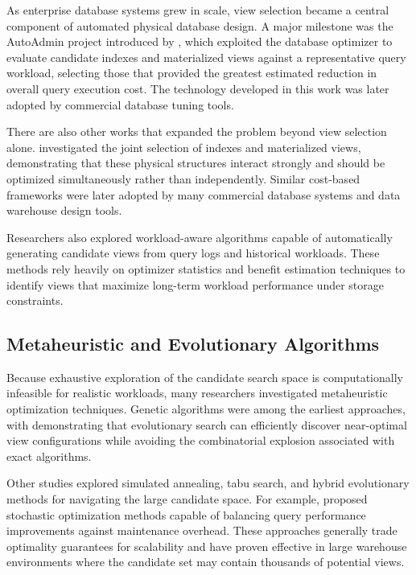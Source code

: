 As enterprise database systems grew in scale, view selection became a central component of automated physical database design. A major milestone was the AutoAdmin project introduced by \textcite{Agrawal_2001}, which exploited the database optimizer to evaluate candidate indexes and materialized views against a representative query workload, selecting those that provided the greatest estimated reduction in overall query execution cost. The technology developed in this work was later adopted by commercial database tuning tools.

There are also other works that expanded the problem beyond view selection alone. \textcite{Agrawal_2000} investigated the joint selection of indexes and materialized views, demonstrating that these physical structures interact strongly and should be optimized simultaneously rather than independently. Similar cost-based frameworks were later adopted by many commercial database systems and data warehouse design tools.

Researchers also explored workload-aware algorithms capable of automatically generating candidate views from query logs and historical workloads. These methods rely heavily on optimizer statistics and benefit estimation techniques to identify views that maximize long-term workload performance under storage constraints.

\subsection{Metaheuristic and Evolutionary Algorithms}

Because exhaustive exploration of the candidate search space is computationally infeasible for realistic workloads, many researchers investigated metaheuristic optimization techniques. Genetic algorithms were among the earliest approaches, with \textcite{Kratica_2003} demonstrating that evolutionary search can efficiently discover near-optimal view configurations while avoiding the combinatorial explosion associated with exact algorithms.

Other studies explored simulated annealing, tabu search, and hybrid evolutionary methods for navigating the large candidate space. For example, \textcite{Bellatreche_2000} proposed stochastic optimization methods capable of balancing query performance improvements against maintenance overhead. These approaches generally trade optimality guarantees for scalability and have proven effective in large warehouse environments where the candidate set may contain thousands of potential views.

